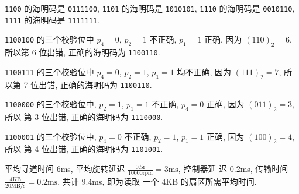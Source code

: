 \documentclass[11pt]{homework}
\begin{document}
\question
\begin{arabicparts}
    \questionpart \texttt{1100} 的海明码是 \texttt{0111100}, \texttt{1101} 的海明码是 \texttt{1010101},
    \texttt{1110} 的海明码是 \texttt{0010110}, \texttt{1111} 的海明码是 \texttt{1111111}.

    \questionpart \texttt{1100100} 的三个校验位中 $p_4 = 0$, $p_2 = 1$ 不正确, $p_1 = 1$ 正确, 因为
    $(110)_2 = 6$, 所以第 6 位出错, 正确的海明码为 \texttt{1100110}.

    \texttt{1100111} 的三个校验位中 $p_4 = 0$, $p_2 = 1$, $p_1 = 1$ 均不正确, 因为 $(111)_2 = 7$,
    所以第 7 位出错, 正确的海明码为 \texttt{1100110}.

    \texttt{1100000} 的三个校验位中, $p_2 = 1$, $p_1 = 1$ 不正确, $p_4 = 0$ 正确, 因为 $(011)_2 = 3$, 所以
    第 3 位出错, 正确的海明码为 \texttt{1110000}.

    \texttt{1100001} 的三个校验位中, $p_4 = 0$ 不正确, $p_2 = 1$, $p_1 = 1$ 正确, 因为 $(100)_2 = 4$, 所以
    第 4 位出错, 正确的海明码为 \texttt{1101001}.
\end{arabicparts}
\question
平均寻道时间 6ms, 平均旋转延迟 $\displaystyle\frac{0.5 \text{r}}{10000\text{rpm}} = 3 \text{ms}$, 控制器延
迟 0.2ms, 传输时间 $\displaystyle \frac{4\text{KB}}{20\text{MB/s}} = 0.2\text{ms}$, 共计 9.4ms, 即为读取
一个 4KB 的扇区所需平均时间.
\end{document}
